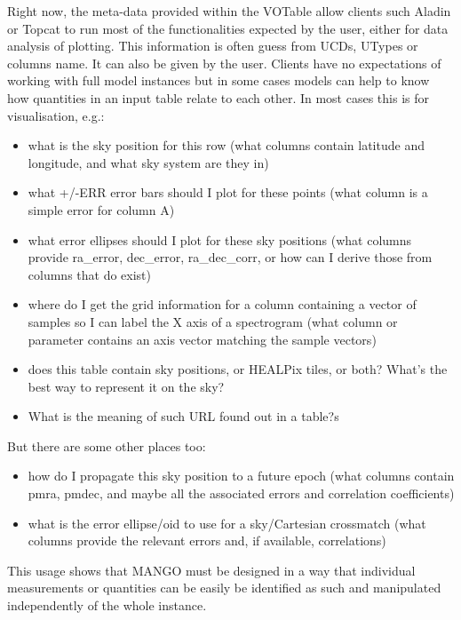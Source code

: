 \documentclass[11pt,a4paper]{ivoa}
\begin{document}
Right now, the meta-data provided within the VOTable allow clients such Aladin or Topcat to run most of the functionalities expected by the user, either for data analysis of plotting.
This information is often guess from UCDs, UTypes or columns name. It can also be given by the user.
Clients have no expectations of working with full model instances but in some cases models can help to know how quantities in an input table relate to each other.
In most cases this is for visualisation, e.g.:
\begin{itemize}
    \item what is the sky position for this row
    (what columns contain latitude and longitude, and what sky system are they in)

     \item what +/-ERR error bars should I plot for these points
    (what column is a simple error for column A)

    \item what error ellipses should I plot for these sky positions
    (what columns provide ra\_error, dec\_error, ra\_dec\_corr,
     or how can I derive those from columns that do exist)

    \item where do I get the grid information for a column containing
    a vector of samples so I can label the X axis of a spectrogram
    (what column or parameter contains an axis vector matching
     the sample vectors)

    \item does this table contain sky positions, or HEALPix tiles, or both?
    What's the best way to represent it on the sky?

    \item What is the meaning of such URL found out in a table?s
\end{itemize}

But there are some other places too:
\begin{itemize}
    \item how do I propagate this sky position to a future epoch
    (what columns contain pmra, pmdec, and maybe all the
     associated errors and correlation coefficients)

    \item what is the error ellipse/oid to use for a sky/Cartesian crossmatch
    (what columns provide the relevant errors and, if available,
     correlations)
\end{itemize}

This usage shows that MANGO must be designed in a way that individual measurements or quantities can be easily be identified as such and manipulated independently of the whole instance.
\end{document}
